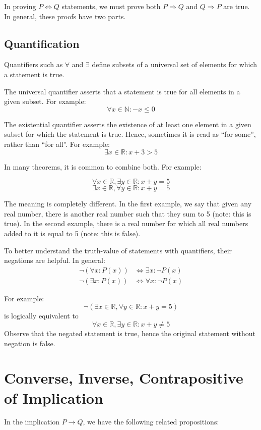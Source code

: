 \documentclass[11pt, a4paper, oneside]{exam}
\theoremstyle{definition}\newtheorem{define}{Definition}[section]
\theoremstyle{remark}\newtheorem{remark}{Remark}
\theoremstyle{definition}\newtheorem{example}{Example}[subsection]
\theoremstyle{definition}\newtheorem{notation}{Notation}[section]
\theoremstyle{definition}\newtheorem{theorem}{Theorem}[section]
\theoremstyle{definition}\newtheorem{corollary}{Corollary}[section]
\begin{document}
In proving $P \Leftrightarrow Q$ statements, we must prove both $P \Rightarrow Q$ and $Q \Rightarrow P$ are true. In general, these proofs have two parts.

\subsection{Quantification}
	Quantifiers such as $\forall$ and $\exists$ define subsets of a universal set of elements for which a statement is true. 

	The universal quantifier asserts that a statement is true for all elements in a given subset. For example: 
	\[ \forall x \in \mathbb{N}: -x \leq 0 \]

	The existential quantifier asserts the existence of at least one element in a given subset for which the statement is true. Hence, sometimes it is read as ``for some'', rather than ``for all''. For example:
	\[ \exists x \in \mathbb{R}: x + 3 > 5 \]

	In many theorems, it is common to combine both. For example:

	\[ \forall x \in \mathbb{R}, \exists y \in \mathbb{R}: x + y = 5\]
	\[ \exists x \in \mathbb{R}, \forall y \in \mathbb{R}: x + y = 5\]

The meaning is completely different. In the first example, we say that given any real number, there is another real number such that they sum to 5 (note: this is true). In the second example, there is a real number for which all real numbers added to it is equal to 5 (note: this is false).

To better understand the truth-value of statements with quantifiers, their negations are helpful. In general:
\begin{align*}
	\neg ( \forall x : P(x)) & \Leftrightarrow \exists x : \neg P(x)\\
	\neg ( \exists x : P(x)) & \Leftrightarrow \forall x : \neg P(x)
\end{align*}

For example:
\[ \neg( \exists x \in \mathbb{R}, \forall y \in \mathbb{R} : x + y = 5) \]
is logically equivalent to
\[ \forall x \in \mathbb{R}, \exists y \in \mathbb{R}: x + y \not = 5\]
Observe that the negated statement is true, hence the original statement without negation is false.

\newpage
\section{Converse, Inverse, Contrapositive of Implication}
In the implication $P \rightarrow Q$, we have the following related propositions:
\end{document}
